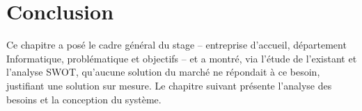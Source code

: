 \section{Conclusion}

Ce chapitre a posé le cadre général du stage -- entreprise d'accueil, département
Informatique, problématique et objectifs -- et a montré, via l'étude de l'existant et
l'analyse SWOT, qu'aucune solution du marché ne répondait à ce besoin, justifiant une
solution sur mesure. Le chapitre suivant présente l'analyse des besoins et la conception
du système.
